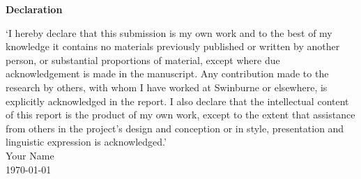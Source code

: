 \thispagestyle{plain}
\Huge
\textbf{Declaration}
\vspace{1cm}

\normalsize
\mdseries

‘I hereby declare that this submission is my own work and to the best of my knowledge it contains no materials previously published or written by another person, or substantial proportions of material, except where due acknowledgement is made in the manuscript. Any contribution made to the research by others, with whom I have worked at Swinburne or elsewhere, is explicitly acknowledged in the report. I also declare that the intellectual content of this report is the product of my own work, except to the extent that assistance from others in the project’s design and conception or in style, presentation and linguistic expression is acknowledged.’
\vspace{5 cm}
\\
Your Name
\\
\today



